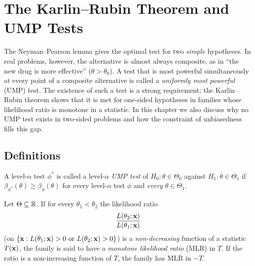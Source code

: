 \documentclass[main.tex]{subfiles}
\begin{document}
\chapter{The Karlin--Rubin Theorem and UMP Tests}\label{ch:karlin-rubin}

The Neyman--Pearson lemma gives the optimal test for two \emph{simple} hypotheses. In real problems, however, the alternative is almost always composite, as in ``the new drug is more effective'' ($\theta>\theta_0$). A test that is most powerful simultaneously at every point of a composite alternative is called a \emph{uniformly most powerful} (UMP) test. The existence of such a test is a strong requirement; the Karlin--Rubin theorem shows that it is met for one-sided hypotheses in families whose likelihood ratio is monotone in a statistic. In this chapter we also discuss why no UMP test exists in two-sided problems and how the constraint of unbiasedness fills this gap.

\section{Definitions}

\begin{definition}
A level-$\alpha$ test $\phi^*$ is called a level-$\alpha$ \emph{UMP test} of $H_0:\theta\in\Theta_0$ against $H_1:\theta\in\Theta_1$ if $\beta_{\phi^*}(\theta)\ge\beta_\phi(\theta)$ for every level-$\alpha$ test $\phi$ and \emph{every} $\theta\in\Theta_1$.
\end{definition}

\begin{definition}\label{def:mlr}
Let $\Theta\subseteq\mathbb{R}$. If for every $\theta_1<\theta_2$ the likelihood ratio
\[
\frac{L(\theta_2;\mathbf{x})}{L(\theta_1;\mathbf{x})}
\]
(on $\{\mathbf{x}: L(\theta_1;\mathbf{x})>0 \text{ or } L(\theta_2;\mathbf{x})>0\}$) is a \emph{non-decreasing} function of a statistic $T(\mathbf{x})$, the family is said to have a \emph{monotone likelihood ratio} (MLR) in $T$. If the ratio is a non-increasing function of $T$, the family has MLR in $-T$.
\end{definition}
\end{document}
